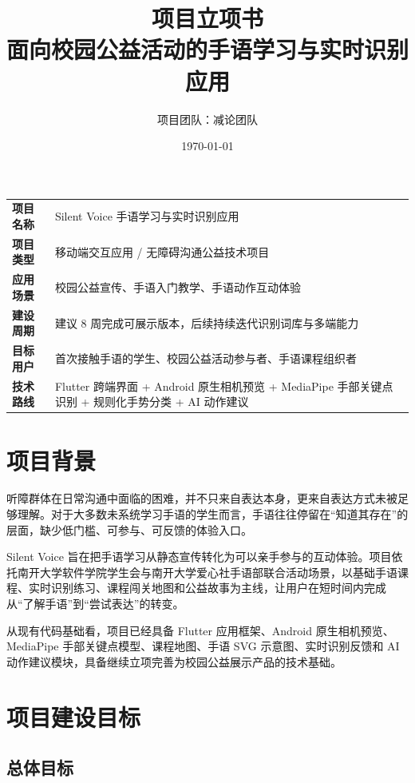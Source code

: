 \documentclass[UTF8,a4paper,12pt]{ctexart}
\title{
  \vspace{-1.5em}
  \textbf{\projectname{} 项目立项书}\\
  \large 面向校园公益活动的手语学习与实时识别应用
}
\author{项目团队：减论团队}
\date{\today}
\newcommand{\projectname}{Silent Voice}
\begin{document}
\maketitle

\begin{center}
\begin{tabularx}{0.88\textwidth}{>{\bfseries}lY}
\toprule
项目名称 & Silent Voice 手语学习与实时识别应用 \\
项目类型 & 移动端交互应用 / 无障碍沟通公益技术项目 \\
应用场景 & 校园公益宣传、手语入门教学、手语动作互动体验 \\
建设周期 & 建议 8 周完成可展示版本，后续持续迭代识别词库与多端能力 \\
目标用户 & 首次接触手语的学生、校园公益活动参与者、手语课程组织者 \\
技术路线 & Flutter 跨端界面 + Android 原生相机预览 + MediaPipe 手部关键点识别 + 规则化手势分类 + AI 动作建议 \\
\bottomrule
\end{tabularx}
\end{center}

\tableofcontents
\newpage

\section{项目背景}

听障群体在日常沟通中面临的困难，并不只来自表达本身，更来自表达方式未被足够理解。对于大多数未系统学习手语的学生而言，手语往往停留在“知道其存在”的层面，缺少低门槛、可参与、可反馈的体验入口。

\projectname{} 旨在把手语学习从静态宣传转化为可以亲手参与的互动体验。项目依托南开大学软件学院学生会与南开大学爱心社手语部联合活动场景，以基础手语课程、实时识别练习、课程闯关地图和公益故事为主线，让用户在短时间内完成从“了解手语”到“尝试表达”的转变。

从现有代码基础看，项目已经具备 Flutter 应用框架、Android 原生相机预览、MediaPipe 手部关键点模型、课程地图、手语 SVG 示意图、实时识别反馈和 AI 动作建议模块，具备继续立项完善为校园公益展示产品的技术基础。

\section{项目建设目标}

\subsection{总体目标}
\end{document}

